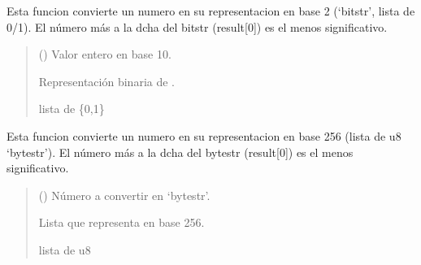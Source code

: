 \documentclass[letterpaper,10pt,english]{sphinxmanual}
\begin{document}
\begin{fulllineitems}
\label{\detokenize{fpga.interfaz_pcps:fpga.interfaz_pcps.int_to_bitstr}}
\pysigstartsignatures
{}
\pysigstopsignatures
\sphinxAtStartPar
Esta funcion convierte un numero  en su representacion en base 2 (‘bitstr’, lista de 0/1). El número más a la dcha del bitstr (result{[}0{]}) es el menos significativo.
\begin{quote}\begin{description}
\sphinxAtStartPar
{} () \textendash{} Valor entero en base 10.

\sphinxAtStartPar
Representación binaria de .

\sphinxAtStartPar
lista de \{0,1\}

\end{description}\end{quote}

\end{fulllineitems}


\begin{fulllineitems}
\label{\detokenize{fpga.interfaz_pcps:fpga.interfaz_pcps.int_to_bytestr}}
\pysigstartsignatures
{}
\pysigstopsignatures
\sphinxAtStartPar
Esta funcion convierte un numero  en su representacion en base 256 (lista de u8 ‘bytestr’). El número más a la dcha del bytestr (result{[}0{]}) es el menos significativo.
\begin{quote}\begin{description}
\sphinxAtStartPar
{} () \textendash{} Número a convertir en ‘bytestr’.

\sphinxAtStartPar
Lista que representa  en base 256.

\sphinxAtStartPar
lista de u8

\end{description}\end{quote}

\end{fulllineitems}
\end{document}
